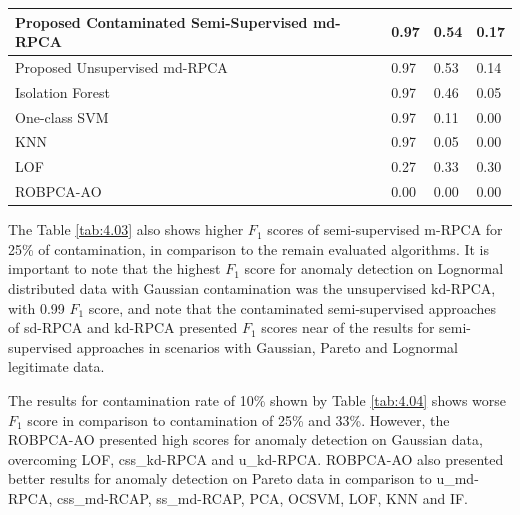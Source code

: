 \documentclass[review]{elsarticle}
\begin{document}
\begin{table}[h!]
\begin{tabular}{| l | l | l | l |}
            Proposed Contaminated Semi-Supervised md-RPCA   &0.97  &0.54  &0.17  \\ \hline
            Proposed Unsupervised md-RPCA &0.97  &0.53  &0.14  \\ \hline
            Isolation Forest \cite{liu2008isolation}  &0.97  &0.46  &0.05  \\ \hline
            One-class SVM \cite{scholkopf2001estimating}    &0.97  &0.11  &0.00  \\ \hline
            KNN \cite{angiulli2002fast}   &0.97  &0.05  &0.00  \\ \hline
            LOF \cite{breunig2000lof}     &0.27  &0.33  &0.30  \\ \hline
            ROBPCA-AO \cite{hubert2009robustskewed}   &0.00  &0.00  &0.00  \\ \hline
	\end{tabular}
\end{table}

The Table \ref{tab:4.03} also shows higher $F_1$ scores of semi-supervised m-RPCA for 25\% of contamination, in comparison to the remain evaluated algorithms. It is important to note that the highest $F_1$ score for anomaly detection on Lognormal distributed data with Gaussian contamination was the unsupervised kd-RPCA, with 0.99 $F_1$ score, and note that the contaminated semi-supervised approaches of sd-RPCA and kd-RPCA presented $F_1$ scores near of the results for semi-supervised approaches in scenarios with Gaussian, Pareto and Lognormal legitimate data.

The results for contamination rate of 10\% shown by Table \ref{tab:4.04} shows worse $F_1$ score in comparison to contamination of 25\% and 33\%. However, the ROBPCA-AO presented high scores for anomaly detection on Gaussian data, overcoming LOF, css\_kd-RPCA and u\_kd-RPCA. ROBPCA-AO also presented better results for anomaly detection on Pareto data in comparison to u\_md-RPCA, css\_md-RCAP, ss\_md-RCAP, PCA, OCSVM, LOF, KNN and IF.
\end{document}
